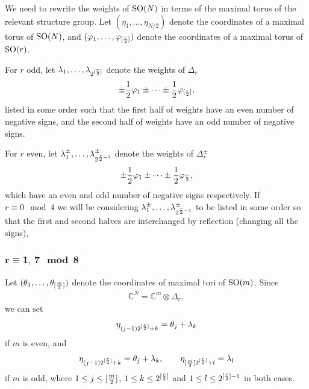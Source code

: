 \documentclass[pdftex]{sigma}
\numberwithin{equation}{section}
\begin{document}
We need to rewrite the weights of ${\rm SO}(N)$ in terms of the maximal torus of the relevant structure group. Let $(\eta_1,\dots, \eta_{N/2})$ denote the coordinates of a maximal torus of ${\rm SO}(N)$, and $(\varphi_1,\dots,\varphi_{[{r\over 2}]})$ denote the coordinates of a maximal torus of ${\rm SO}(r)$.

For $r$ odd, let $\lambda_1,\dots,\lambda_{2^{[{r\over 2}]}}$ denote the weights of $\Delta_r$
\begin{gather*}\pm {1\over 2}\varphi_1\pm\cdots\pm {1\over 2}\varphi_{[{r\over 2}]},\end{gather*}
listed in some order such that the f\/irst half of weights have an even number of negative signs, and the second half of weights have an odd number of negative signs.

For $r$ even, let $\lambda_1^\pm,\dots,\lambda_{2^{{r\over 2}-1}}^\pm$ denote the weights of $\Delta_r^\pm$
\begin{gather*}\pm {1\over 2}\varphi_1\pm\cdots\pm {1\over 2}\varphi_{{r\over 2}},\end{gather*}
which have an even and odd number of negative signs respectively. If $r \equiv 0 \mod 4$ we will be considering $\lambda_1^\pm,\dots,\lambda_{2^{{r\over 2}-1}}^\pm$ to be listed in some order so that the f\/irst and second halves are interchanged by ref\/lection (changing all the signs),

\subsubsection[$r\equiv1,\, 7 \mod 8$]{$\boldsymbol{r\equiv1,\,7 \mod 8}$}
Let $(\theta_1,\dots,\theta_{[{m\over2}]})$ denote the coordinates of maximal tori of ${\rm SO}(m)$. Since
\begin{gather*}\mathbb{C}^N=\mathbb{C}^{m}\otimes \Delta_r,\end{gather*}
we can set
\begin{gather*}
 \eta_{(j-1)2^{[{r\over 2}]}+k}= \theta_j + \lambda_k
\end{gather*}
 if $m$ is even, and
\begin{gather*}
 \eta_{(j-1)2^{[{r\over 2}]}+k}= \theta_j + \lambda_k, \qquad
 \eta_{[{m\over2}]2^{[{r\over 2}]}+l}= \lambda_l
\end{gather*}
if $m$ is odd, where $1\leq j\leq [{m\over 2}]$, $1\leq k \leq 2^{[{r\over 2}]}$ and $1\leq l \leq 2^{[{r\over 2}]-1}$ in both cases.
\end{document}
